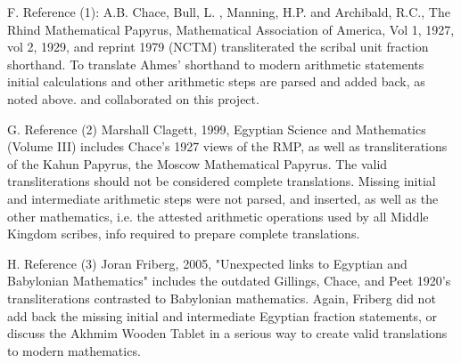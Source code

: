 \documentclass[12pt]{article}
\begin{document}
F. Reference (1): A.B. Chace, Bull, L.
, Manning, H.P. and Archibald, R.C., The Rhind Mathematical Papyrus, Mathematical Association of America, Vol 1, 1927, vol 2, 1929, and reprint 1979 (NCTM) transliterated the scribal unit fraction shorthand. To translate Ahmes' shorthand to modern arithmetic statements initial calculations and other arithmetic steps are parsed and added back, as noted above.  and  collaborated on this project.

G. Reference (2) Marshall Clagett,  1999,  Egyptian Science and Mathematics (Volume III) includes Chace's 1927 views of the RMP, as well as transliterations of the Kahun Papyrus, the Moscow Mathematical Papyrus. The valid transliterations should not be considered complete translations. Missing initial and intermediate arithmetic steps were not parsed, and inserted, as well as the other mathematics, i.e. the attested arithmetic operations used by all Middle Kingdom scribes, info required to prepare complete translations.

H. Reference (3) Joran Friberg, 2005, "Unexpected links to Egyptian and Babylonian Mathematics" includes the outdated Gillings, Chace, and Peet 1920's transliterations contrasted to Babylonian mathematics. Again, Friberg did not add back the missing initial and intermediate Egyptian fraction statements, or discuss the Akhmim Wooden Tablet in a serious way to create valid translations to modern mathematics.

\end{document}

